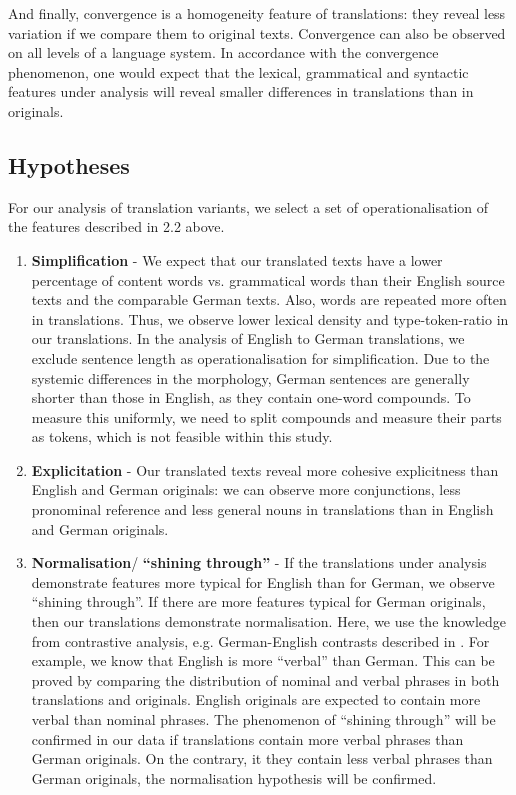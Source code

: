 \documentclass[output=paper]{LSP/langsci}
\begin{document}
And finally, convergence is a homogeneity feature of translations:  they reveal less variation if we compare them to original texts.  Convergence can also be observed on all levels of a language system. In accordance with the convergence phenomenon, one would expect that the lexical, grammatical and syntactic features under analysis will reveal smaller differences in translations than in originals.

\subsection{Hypotheses}

For our analysis of translation variants, we select a set of operationalisation of the features described in 2.2 above. 
 
\begin{enumerate}
\item \textbf{Simplification} - We expect that our translated texts have a lower percentage of content words vs. grammatical words than their English source texts and the comparable German texts. Also, words are repeated more often in translations. Thus, we observe lower lexical density and type-token-ratio in our translations. In the analysis of English to German translations, we exclude sentence length as operationalisation for simplification. Due to the systemic differences in the morphology, German sentences are generally shorter than those in English, as they contain one-word compounds. To measure this uniformly, we need to split compounds and measure their parts as tokens, which is not feasible within this study.

\item \textbf{Explicitation} - Our translated texts reveal more cohesive explicitness than English and German originals: we can observe more conjunctions, less pronominal reference and less general nouns in translations than in English and German originals.

\item \textbf{Normalisation}/ \textbf{“shining through”} - If the translations under analysis demonstrate features more typical for English than for German, we observe “shining through”. If there are more features typical for German originals, then our translations demonstrate normalisation. Here, we use the knowledge from contrastive analysis, e.g. German-English contrasts described in \citep{Hawkins1986,KoenigGast2007,Steiner2012}. For example, we know that English is more “verbal” than German. This can be proved by comparing the distribution of nominal and verbal phrases in both translations and originals. English originals are expected to contain more verbal than nominal phrases. The phenomenon of “shining through” will be confirmed in our data if translations contain more verbal phrases than German originals. On the contrary, it they contain less verbal phrases than German originals, the normalisation hypothesis will be confirmed.


\end{enumerate}
\end{document}
